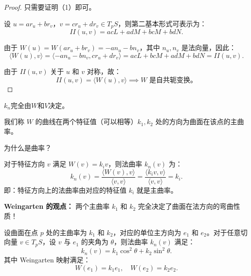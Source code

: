 \documentclass[lang=cn,10pt,thmcnt=section]{elegantbook}
\begin{document}
            \begin{proof}
                只需要证明（1）即可。

                设 $u = a r_u + b r_v$，$v = c r_u + d r_v \in T_pS$，则第二基本形式可表示为：
                \[
                II(u,v) = a c L + a d M + b c M + b d N.
                \]
                
                由于 $W(u) = W(a r_u + b r_v) = -a n_u - b n_v$，其中 $n_u, n_v$ 是法向量，因此：
                \[
                \langle W(u), v \rangle = \langle -a n_u - b n_v, c r_u + d r_v \rangle = a c L + b c M + a d M + b d N = II(u,v).
                \]
                
                由于 $II(u,v)$ 关于 $u$ 和 $v$ 对称，故：
                \[
                II(u,v) = \langle W(u), v \rangle \implies W \text{ 是自共轭变换。}
                \]
                
            \end{proof}
\begin{corollary}
    $k_n$完全由$W$和$V$决定。
\end{corollary}



\begin{definition}[主曲率]
    我们称 $W$ 的曲线在两个特征值（可以相等）$k_1, k_2$ 处的方向为曲面在该点的主曲率。
    \end{definition}
    
    

\begin{remark}
    为什么是曲率？
    
    对于特征方向 $v$ 满足 $W(v) = k_i v$，则法曲率 $k_n(v)$ 为：
    \[
    k_n(v) = \frac{\langle W(v), v \rangle}{\langle v, v \rangle} = \frac{\langle k_i v, v \rangle}{\langle v, v \rangle} = k_i.
    \]
    即：特征方向上的法曲率由对应的特征值 $k_i$ 就是主曲率。
\end{remark}
\textbf{Weingarten 的观点：} 两个主曲率 $k_1$ 和 $k_2$ 完全决定了曲面在法方向的弯曲性质！


\begin{proposition}[Euler公式]
    设曲面在点 $p$ 处的主曲率为 $k_1$ 和 $k_2$，对应的单位主方向为 $e_1$ 和 $e_2$。对于任意切向量 $v \in T_pS$，设 $v$ 与 $e_1$ 的夹角为 $\theta$，则法曲率 $k_n(v)$ 满足：
    \[
    k_n(v) = k_1 \cos^2 \theta + k_2 \sin^2 \theta.
    \]
    其中 Weingarten 映射满足：
    \[
    W(e_1) = k_1 e_1, \quad W(e_2) = k_2 e_2.
    \]
    \end{proposition}
    
\end{document}
